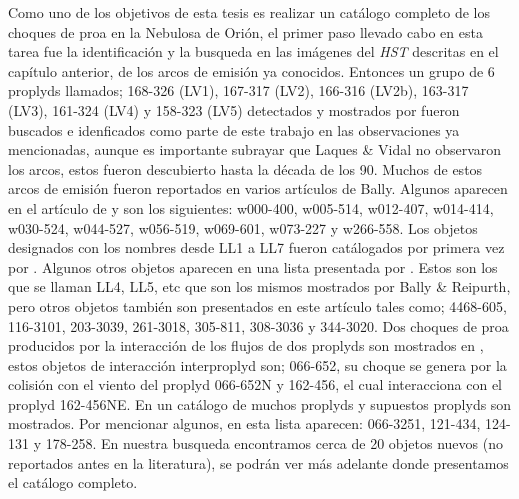 %



%

\label{chap:methodology}
Como uno de los objetivos de esta tesis es realizar un catálogo completo de los choques de proa en la Nebulosa de Orión, el primer paso llevado cabo en esta tarea fue la identificación y la busqueda en las imágenes del \textit{HST} descritas en el capítulo anterior, de los arcos de emisión ya conocidos. Entonces un grupo de 6 proplyds llamados; 168-326 (LV1), 167-317 (LV2), 166-316 (LV2b), 163-317 (LV3), 161-324 (LV4) y 158-323 (LV5) detectados y mostrados por  \citet{Laques:1979} fueron buscados e idenficados como parte de este trabajo en las observaciones ya mencionadas, aunque es importante subrayar que Laques \& Vidal no observaron los arcos, estos fueron descubierto hasta la década de los 90. Muchos de estos arcos de emisión fueron reportados en varios artículos de Bally. Algunos aparecen en el artículo de \citet{Bally:2000a} y son los siguientes: w000-400, w005-514, w012-407, w014-414, w030-524, w044-527, w056-519, w069-601, w073-227 y w266-558. Los objetos designados con los nombres desde LL1 a LL7 fueron catálogados por primera vez por \citet{Bally:2001a}. Algunos otros objetos aparecen en una lista presentada por \citet{Bally:2006a}. Estos son los que se llaman LL4, LL5, etc que son los mismos mostrados por Bally \& Reipurth, pero otros objetos también son presentados en este artículo tales como; 4468-605, 116-3101, 203-3039, 261-3018, 305-811, 308-3036 y 344-3020. Dos choques de proa producidos por la interacción de los flujos de dos proplyds son mostrados en \citet{Reipurth:2007}, estos objetos de interacción interproplyd son; 066-652, su choque se genera por la colisión con el viento del proplyd 066-652N y 162-456, el cual interacciona con el proplyd 162-456NE. En un catálogo de \citet{Ricci:2008} muchos proplyds y supuestos proplyds son mostrados. Por mencionar algunos, en esta lista aparecen: 066-3251, 121-434, 124-131 y 178-258. En nuestra busqueda encontramos cerca de 20 objetos nuevos (no reportados antes en la literatura), se podrán ver más adelante donde presentamos el catálogo completo. \\         

